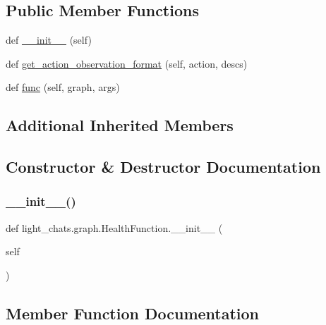 \subsection*{Public Member Functions}
\begin{DoxyCompactItemize}
\item 
def \hyperlink{classlight__chats_1_1graph_1_1HealthFunction_a523a336bf9edf8f3fd8bc2afa400e633}{\+\_\+\+\_\+init\+\_\+\+\_\+} (self)
\item 
def \hyperlink{classlight__chats_1_1graph_1_1HealthFunction_a436cadbb6f2ae2cb77521c013caa8063}{get\+\_\+action\+\_\+observation\+\_\+format} (self, action, descs)
\item 
def \hyperlink{classlight__chats_1_1graph_1_1HealthFunction_aa79079c84c63fb936ef8ed5afa5bafca}{func} (self, graph, args)
\end{DoxyCompactItemize}
\subsection*{Additional Inherited Members}


\subsection{Constructor \& Destructor Documentation}
\mbox{\label{classlight__chats_1_1graph_1_1HealthFunction_a523a336bf9edf8f3fd8bc2afa400e633}} 
\subsubsection{\texorpdfstring{\+\_\+\+\_\+init\+\_\+\+\_\+()}{\_\_init\_\_()}}
{\footnotesize\ttfamily def light\+\_\+chats.\+graph.\+Health\+Function.\+\_\+\+\_\+init\+\_\+\+\_\+ (\begin{DoxyParamCaption}\item[{}]{self }\end{DoxyParamCaption})}



\subsection{Member Function Documentation}
\mbox{\label{classlight__chats_1_1graph_1_1HealthFunction_aa79079c84c63fb936ef8ed5afa5bafca}} 
